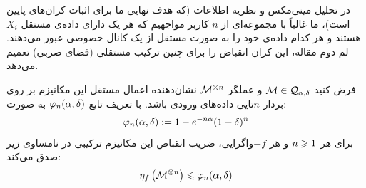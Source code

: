 در تحلیل مینی‌مکس و نظریه اطلاعات (که هدف نهایی ما برای اثبات کران‌های پایین است)، ما غالباً با مجموعه‌ای از $n$ کاربر مواجهیم که هر یک دارای داده‌ی مستقل $X_i$ هستند و هر کدام داده‌ی خود را به صورت مستقل از یک کانال خصوصی عبور می‌دهند. لم دوم مقاله، این کران انقباض را برای چنین ترکیب مستقلی (فضای ضربی) تعمیم می‌دهد.

\begin{لم}
\label{lem:tensor-contraction}
فرض کنید $\mech \in \mathcal{Q}_{\al,\del}$ و عملگر $\mech^{\otimes n}$ نشان‌دهنده اعمال مستقل این مکانیزم بر روی بردار $n$تایی داده‌های ورودی باشد. با تعریف تابع $\varphi_n(\alpha, \delta)$ به صورت:
\begin{equation}
\label{eq:phi-n-def}
\varphi_n(\alpha, \delta) := 1 - e^{-n\alpha}(1 - \delta)^n
\end{equation}
برای هر $n \geqslant 1$ و هر $-f$واگرایی، ضریب انقباض این مکانیزم ترکیبی در نامساوی زیر صدق می‌کند:
\begin{equation}
\label{eq:lem2-asoodeh}
\eta_f\left( \mech^{\otimes n} \right) \lee \vph_n(\al, \del)
\end{equation}
\end{لم}

